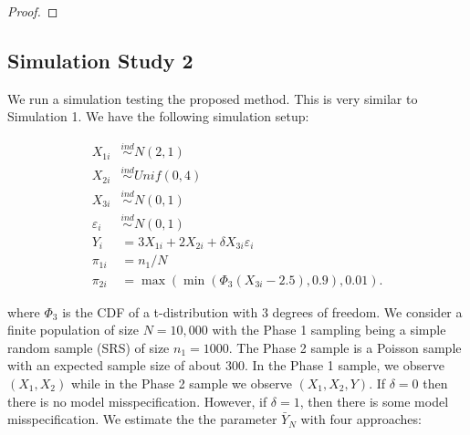 \documentclass[12pt]{article}
\begin{document}
\begin{proof}
\end{proof}

\subsection{Simulation Study 2}

We run a simulation testing the proposed method. This is very similar to
Simulation 1. We have the following simulation setup:

$$
\begin{aligned}
X_{1i} &\stackrel{ind}{\sim} N(2, 1) \\
X_{2i} &\stackrel{ind}{\sim} Unif(0, 4) \\
X_{3i} &\stackrel{ind}{\sim} N(0, 1) \\
\varepsilon_i &\stackrel{ind}{\sim} N(0, 1) \\
Y_{i} &= 3 X_{1i} + 2 X_{2i} + \delta X_{3i} \varepsilon_i \\
\pi_{1i} &= n_1 / N \\
\pi_{2i} &= \max(\min(\Phi_3(X_{3i} - 2.5), 0.9), 0.01).
\end{aligned}
$$

where $\Phi_3$ is the CDF of a t-distribution with 3 degrees of freedom.
We consider a finite population of size $N = 10,000$ with the Phase 1 
sampling being a simple random sample (SRS) of size $n_1 = 1000$. The Phase 2
sample is a Poisson sample with an expected sample size of about 300.
In the Phase 1 sample, we observe 
$(X_1, X_2)$ while in the Phase 2 sample we observe $(X_1, X_2, Y)$. 
If $\delta = 0$ then there is no model misspecification. However, if $\delta =
1$, then there is some model misspecification. We estimate the
the parameter $\bar Y_N$ with four approaches:
\end{document}
